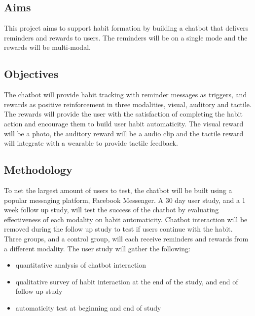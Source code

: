 \subsection*{Aims}
This project aims to support habit formation by building a chatbot that delivers reminders and rewards to users. The reminders will be on a single mode and the rewards will be multi-modal.

\subsection*{Objectives}
The chatbot will provide habit tracking with reminder messages as triggers, and rewards as positive reinforcement in three modalities, visual, auditory and tactile.\newline
\newline
The rewards will provide the user with the satisfaction of completing the habit action and encourage them to build user habit automaticity. The visual reward will be a photo, the auditory reward will be a audio clip and the tactile reward will integrate with a wearable to provide tactile feedback.

\subsection*{Methodology}
To net the largest amount of users to test, the chatbot will be built using a popular messaging platform, Facebook Messenger.\newline
\newline
A 30 day user study, and a 1 week follow up study, will test the success of the chatbot by evaluating effectiveness of each modality on habit automaticity. Chatbot interaction will be removed during the follow up study to test if users continue with the habit. Three groups, and a control group, will each receive reminders and rewards from a different modality.\newline
\newline
The user study will gather the following:
\begin{itemize}
  \item quantitative analysis of chatbot interaction
  \item qualitative survey of habit interaction at the end of the study, and end of follow up study
  \item automaticity test at beginning and end of study
\end{itemize}

